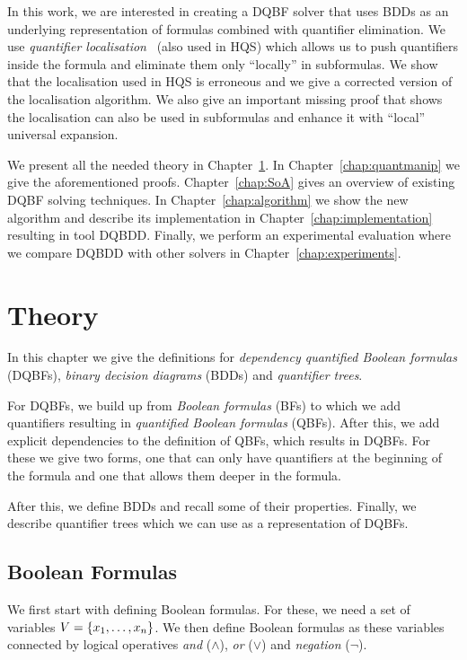 \documentclass[
  digital, %
  color,
  twoside, %
  table,   %
  nolof,     %
  nolot,     %
]{fithesis3}
\let\setbuilder\set
\newcommand{\simpleset}[1]{\{{#1}\}}
\renewcommand{\set}[1]{\normalexpandarg\IfSubStr{#1}{|}{\setbuilder{#1}}{\simpleset{#1}}}
\theoremstyle{definition}
\theoremstyle{remark}
\begin{document}
In this work, we are interested in creating a DQBF solver that uses BDDs as an underlying representation of formulas combined with quantifier elimination. We use \emph{quantifier localisation}~\cite{HQSquantifierLocalisation} (also used in HQS) which allows us to push quantifiers inside the formula and eliminate them only ``locally'' in subformulas. We show that the localisation used in HQS is erroneous and we give a corrected version of the localisation algorithm. We also give an important missing proof that shows the localisation can also be used in subformulas and enhance it with ``local'' universal expansion. 

We present all the needed theory in Chapter~\ref{chap:theory}. In Chapter~\ref{chap:quantmanip} we give the aforementioned proofs.
Chapter~\ref{chap:SoA} gives an overview of existing DQBF solving techniques. In Chapter~\ref{chap:algorithm} we show the new algorithm and describe its implementation in Chapter~\ref{chap:implementation} resulting in tool DQBDD. Finally, we perform an experimental evaluation where we compare DQBDD with other solvers in Chapter~\ref{chap:experiments}.

\chapter{Theory}
\label{chap:theory}
In this chapter we give the definitions for \emph{dependency quantified Boolean formulas} (DQBFs), \emph{binary decision diagrams} (BDDs) and \emph{quantifier trees}.

For DQBFs, we build up from \emph{Boolean formulas} (BFs) to which we add quantifiers resulting in \emph{quantified Boolean formulas} (QBFs). After this, we add explicit dependencies to the definition of QBFs, which results in DQBFs. For these we give two forms, one that can only have quantifiers at the beginning of the formula and one that allows them deeper in the formula.

After this, we define BDDs and recall some of their properties. Finally, we describe quantifier trees which we can use as a representation of DQBFs.

\section{Boolean Formulas}
We first start with defining Boolean formulas. For these, we need a set of variables $V = \set{x_1, \dots, x_n}$. We then define Boolean formulas as these variables connected by logical operatives \emph{and} (${\land}$), \emph{or} (${\lor}$) and \emph{negation} (${\neg}$).
\end{document}
